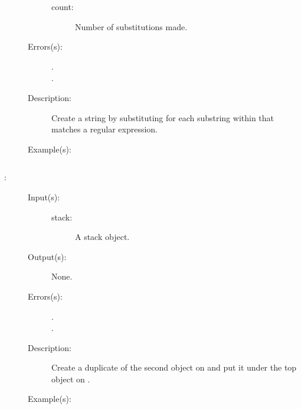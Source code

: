\begin{description}
\begin{description}
\begin{description}
		\item[count: ]
			Number of substitutions made.
		\end{description}
	\item[Errors(s): ]
		\begin{description}\item[]
		\item[.]
		\item[.]
		\end{description}
	\item[Description: ]
		Create a string by substituting  for each
		substring within  that matches a regular
		expression.
	\item[Example(s): ]\begin{verbatim}

		\end{verbatim}
	\end{description}
\label{systemdict:sunder}
\item[{\onyxop{stack}{sunder}{--}}: ]
	\begin{description}\item[]
	\item[Input(s): ]
		\begin{description}\item[]
		\item[stack: ]
			A stack object.
		\end{description}
	\item[Output(s): ] None.
	\item[Errors(s): ]
		\begin{description}\item[]
		\item[.]
		\item[.]
		\end{description}
	\item[Description: ]
		Create a duplicate of the second object on  and put
		it under the top object on .
	\item[Example(s): ]\begin{verbatim}


\end{verbatim}
\end{description}
\end{description}
